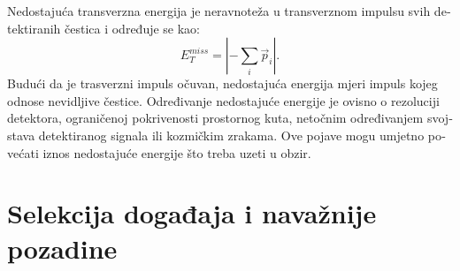 \begin{otherlanguage}{croatian}
\par Nedostajuća transverzna energija je neravnoteža u transverznom impulsu svih detektiranih čestica i određuje se kao:
\begin{equation}
E_T^{miss}= |-\sum_{i} \vec{p}_i|.
\end{equation}
Budući da je trasverzni impuls očuvan, nedostajuća energija mjeri impuls kojeg odnose nevidljive čestice. Određivanje nedostajuće energije je ovisno o rezoluciji detektora, ograničenoj pokrivenosti prostornog kuta, netočnim određivanjem svojstava detektiranog signala ili kozmičkim zrakama. Ove pojave mogu umjetno povećati iznos nedostajuće energije što treba uzeti u obzir.  

\section{Selekcija događaja i navažnije pozadine}
 

\end{otherlanguage}

